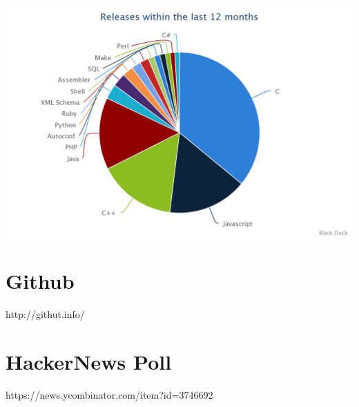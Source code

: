 \includegraphics[width=\linewidth]{../../data/js-trends/black-duck-15}


\section{Github}

http://githut.info/



\section{HackerNews Poll}

https://news.ycombinator.com/item?id=3746692

